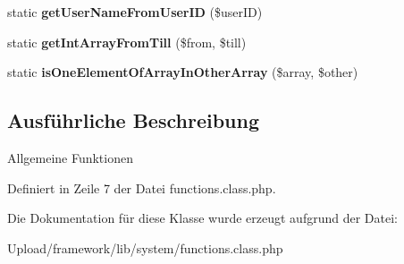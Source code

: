 \begin{DoxyCompactItemize}
\item 
\mbox{\label{classfunctions_a354395dbc83e842e8e64df25a0781aaf}} 
static {\bfseries get\+User\+Name\+From\+User\+ID} (\$user\+ID)
\item 
\mbox{\label{classfunctions_ac20b6adfbb304c09131f82b3bf725dc7}} 
static {\bfseries get\+Int\+Array\+From\+Till} (\$from, \$till)
\item 
\mbox{\label{classfunctions_a7ef3e3a6098e5021050157ab128430f8}} 
static {\bfseries is\+One\+Element\+Of\+Array\+In\+Other\+Array} (\$array, \$other)
\end{DoxyCompactItemize}


\subsection{Ausführliche Beschreibung}
Allgemeine Funktionen 

Definiert in Zeile 7 der Datei functions.\+class.\+php.



Die Dokumentation für diese Klasse wurde erzeugt aufgrund der Datei\+:\begin{DoxyCompactItemize}
\item 
Upload/framework/lib/system/functions.\+class.\+php\end{DoxyCompactItemize}
